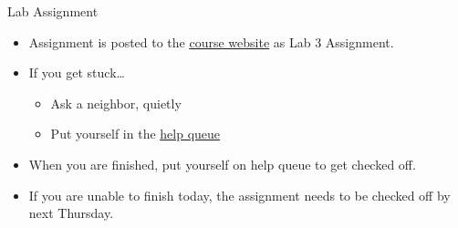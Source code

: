 \documentclass[dvipsnames]{beamer}
\begin{document}
\begin{frame}{Lab Assignment}
	\begin{itemize}
		\item Assignment is posted to the \href{http://www.eecs.umich.edu/eecs/courses/eecs470}{\underline{course website}} as Lab
			3 Assignment.
		\item If you get stuck\dots
			\begin{itemize}
				\item Ask a neighbor, quietly
				\item Put yourself in the 
					\href{https://oh.eecs.umich.edu/courses/eecs470}{\underline{help queue}}
			\end{itemize}
		\item When you are finished, put yourself on help queue to get checked off.
		\item If you are unable to finish today, the assignment needs to be
			checked off by next Thursday.
	\end{itemize}
\end{frame}
\end{document}
